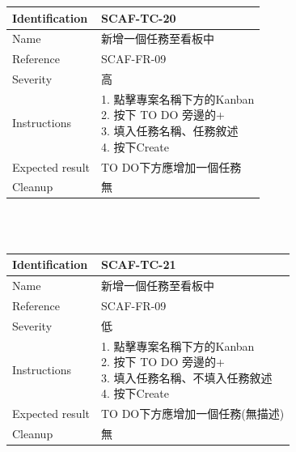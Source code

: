 \documentclass{report}
\begin{document}
\begin{tabularx}{\textwidth}{
  |p{}%
  |p{}|%
  }
  \hline
  \centering Identification &  SCAF-TC-20 \\
  \hline
  \centering Name & 新增一個任務至看板中 \\
  \hline
  \centering Reference & SCAF-FR-09 \\
  \hline
  \centering Severity & 高 \\
  \hline
  \centering Instructions & 
  \makecell[l]{
    1. 點擊專案名稱下方的Kanban  \\
    2. 按下 TO DO 旁邊的+  \\
    3. 填入任務名稱、任務敘述  \\
    4. 按下Create
  }\\
  \hline
  \centering Expected result & TO DO下方應增加一個任務 \\
  \hline
  \centering Cleanup & 無 \\
  \hline
\end{tabularx}
\\
\newline
\\
\begin{tabularx}{\textwidth}{
  |p{}%
  |p{}|%
  }
  \hline
  \centering Identification &  SCAF-TC-21 \\
  \hline
  \centering Name & 新增一個任務至看板中 \\
  \hline
  \centering Reference & SCAF-FR-09 \\
  \hline
  \centering Severity & 低 \\
  \hline
  \centering Instructions & 
  \makecell[l]{
    1. 點擊專案名稱下方的Kanban  \\
    2. 按下 TO DO 旁邊的+  \\
    3. 填入任務名稱、不填入任務敘述  \\
    4. 按下Create
  }\\
  \hline
  \centering Expected result & TO DO下方應增加一個任務(無描述) \\
  \hline
  \centering Cleanup & 無 \\
  \hline
\end{tabularx}
\\
\newline
\\
\end{document}

